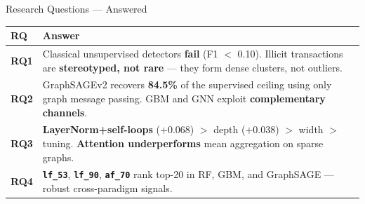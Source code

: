 \documentclass[aspectratio=169,11pt]{beamer}
\newcommand{\hi}[1]{\textcolor{accent}{\textbf{#1}}}
\newcommand{\ok}[1]{\textcolor{good}{\textbf{#1}}}
\begin{document}
\begin{frame}{Research Questions --- Answered}
  \begin{tabular}{@{}p{}p{}@{}}
    \toprule
    \textbf{RQ} & \textbf{Answer} \\
    \midrule
    \textbf{RQ1} &
      Classical unsupervised detectors \hi{fail} (F1 $<$ 0.10).
      Illicit transactions are \textbf{stereotyped, not rare} --- they form
      dense clusters, not outliers. \\[4pt]
    \textbf{RQ2} &
      GraphSAGEv2 recovers \ok{84.5\%} of the supervised ceiling
      using only graph message passing.
      GBM and GNN exploit \textbf{complementary channels}. \\[4pt]
    \textbf{RQ3} &
      \ok{LayerNorm+self-loops} ($+$0.068) $>$ depth ($+$0.038)
      $>$ width $>$ tuning.
      \hi{Attention underperforms} mean aggregation on sparse graphs. \\[4pt]
    \textbf{RQ4} &
      \ok{\texttt{lf\_53}}, \ok{\texttt{lf\_90}}, \ok{\texttt{af\_70}}
      rank top-20 in RF, GBM, and GraphSAGE --- robust cross-paradigm signals. \\
    \bottomrule
  \end{tabular}
\end{frame}
\end{document}
